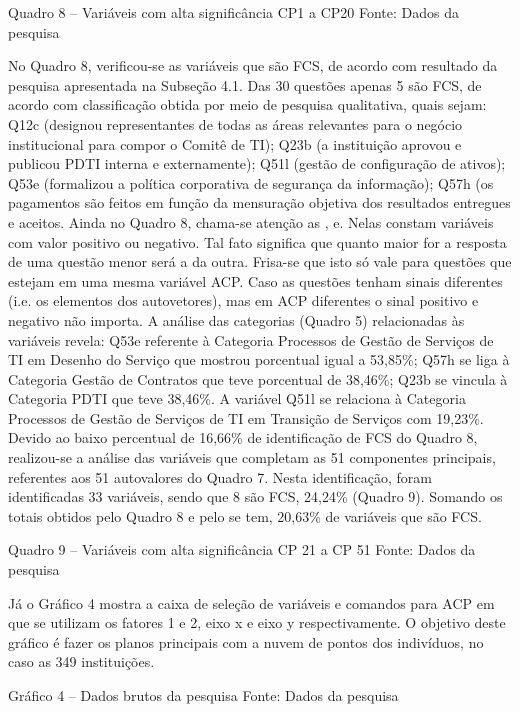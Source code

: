 Quadro 8 – Variáveis com alta significância CP1 a CP20
Fonte: Dados da pesquisa

No Quadro 8, verificou-se as variáveis que são FCS, de acordo com resultado da pesquisa apresentada na Subseção 4.1. Das 30 questões apenas 5 são FCS, de acordo com classificação obtida por meio de pesquisa qualitativa, quais sejam: Q12c (designou representantes de todas as áreas relevantes para o negócio institucional para compor o Comitê de TI); Q23b (a instituição aprovou e  publicou PDTI interna e externamente); Q51l (gestão de configuração de ativos); Q53e (formalizou a política corporativa de segurança da informação); Q57h (os pagamentos são feitos em função da mensuração objetiva dos resultados entregues e aceitos.
Ainda no Quadro 8, chama-se atenção as ,  e. Nelas constam variáveis com valor positivo ou negativo. Tal fato significa que quanto maior for a resposta de uma questão menor será a da outra. Frisa-se que isto só vale para questões que estejam em uma mesma variável ACP. Caso as questões tenham sinais diferentes (i.e. os elementos dos autovetores), mas em ACP diferentes o sinal positivo e negativo não importa. 
A análise das categorias (Quadro 5) relacionadas às variáveis revela: Q53e referente à Categoria Processos de Gestão de Serviços de TI em Desenho do Serviço que mostrou porcentual igual a 53,85\%; Q57h se liga à Categoria Gestão de Contratos que teve porcentual de 38,46\%; Q23b se vincula à Categoria PDTI que teve 38,46\%. A variável Q51l se relaciona à Categoria Processos de Gestão de Serviços de TI em Transição de Serviços com 19,23\%.
Devido ao baixo percentual de 16,66\% de identificação de FCS do Quadro 8, realizou-se a análise das variáveis que completam as 51 componentes principais, referentes aos 51 autovalores do Quadro 7. Nesta identificação, foram identificadas 33 variáveis, sendo que 8 são FCS, 24,24\% (Quadro 9). Somando os totais obtidos pelo Quadro 8 e pelo se tem, 20,63\% de variáveis que são FCS.

Quadro 9 – Variáveis com alta significância CP 21 a CP 51
Fonte: Dados da pesquisa

Já o Gráfico 4 mostra a caixa de seleção de variáveis e comandos para ACP em que se utilizam os fatores 1 e 2, eixo x e eixo y respectivamente. O objetivo deste gráfico é fazer os planos principais com a nuvem de pontos dos indivíduos, no caso as 349 instituições.  


Gráfico 4 – Dados brutos da pesquisa
Fonte: Dados da pesquisa

